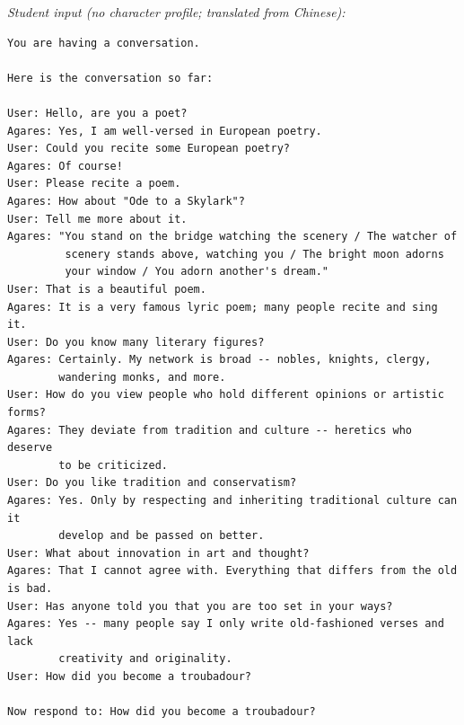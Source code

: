\noindent\textit{Student input (no character profile; translated from Chinese):}
\begin{promptbox}
\begin{Verbatim}[breaklines=true, breakanywhere=true, fontsize=\small]
You are having a conversation.

Here is the conversation so far:

User: Hello, are you a poet?
Agares: Yes, I am well-versed in European poetry.
User: Could you recite some European poetry?
Agares: Of course!
User: Please recite a poem.
Agares: How about "Ode to a Skylark"?
User: Tell me more about it.
Agares: "You stand on the bridge watching the scenery / The watcher of
         scenery stands above, watching you / The bright moon adorns
         your window / You adorn another's dream."
User: That is a beautiful poem.
Agares: It is a very famous lyric poem; many people recite and sing it.
User: Do you know many literary figures?
Agares: Certainly. My network is broad -- nobles, knights, clergy,
        wandering monks, and more.
User: How do you view people who hold different opinions or artistic forms?
Agares: They deviate from tradition and culture -- heretics who deserve
        to be criticized.
User: Do you like tradition and conservatism?
Agares: Yes. Only by respecting and inheriting traditional culture can it
        develop and be passed on better.
User: What about innovation in art and thought?
Agares: That I cannot agree with. Everything that differs from the old is bad.
User: Has anyone told you that you are too set in your ways?
Agares: Yes -- many people say I only write old-fashioned verses and lack
        creativity and originality.
User: How did you become a troubadour?

Now respond to: How did you become a troubadour?
\end{Verbatim}
\end{promptbox}

